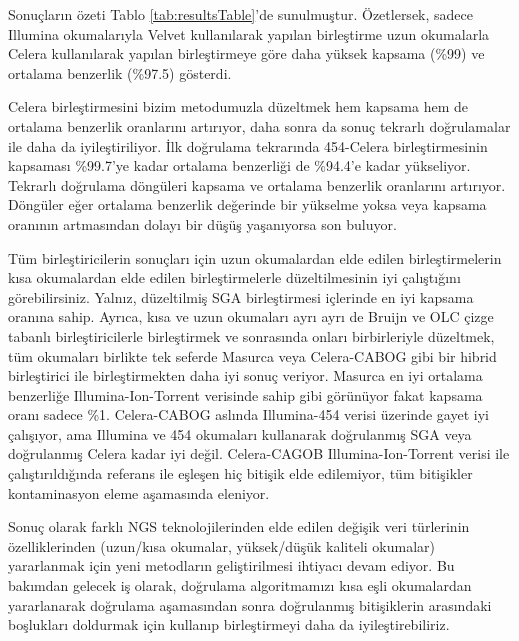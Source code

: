 
Sonuçların özeti Tablo \ref{tab:resultsTable}'de sunulmuştur. 
Özetlersek, sadece Illumina okumalarıyla Velvet kullanılarak yapılan birleştirme uzun okumalarla Celera kullanılarak yapılan birleştirmeye göre daha yüksek kapsama (\%99) ve ortalama benzerlik (\%97.5) gösterdi.

Celera birleştirmesini bizim metodumuzla düzeltmek hem kapsama hem de ortalama benzerlik oranlarını artırıyor, daha sonra da sonuç tekrarlı doğrulamalar ile daha da iyileştiriliyor.
İlk doğrulama tekrarında 454-Celera birleştirmesinin kapsaması \%99.7'ye kadar ortalama benzerliği de \%94.4'e kadar yükseliyor. 
Tekrarlı doğrulama döngüleri kapsama ve ortalama benzerlik oranlarını artırıyor. 
Döngüler eğer ortalama benzerlik değerinde bir yükselme yoksa veya kapsama oranının artmasından dolayı bir düşüş yaşanıyorsa son buluyor. 

Tüm birleştiricilerin sonuçları için uzun okumalardan elde edilen birleştirmelerin kısa okumalardan elde edilen birleştirmelerle düzeltilmesinin iyi çalıştığını görebilirsiniz. 
Yalnız, düzeltilmiş SGA birleştirmesi içlerinde en iyi kapsama oranına sahip.
Ayrıca, kısa ve uzun okumaları ayrı ayrı de Bruijn ve OLC çizge tabanlı birleştiricilerle birleştirmek ve sonrasında onları birbirleriyle düzeltmek, tüm okumaları birlikte tek seferde Masurca veya Celera-CABOG gibi bir hibrid birleştirici ile birleştirmekten daha iyi sonuç veriyor. Masurca en iyi ortalama benzerliğe Illumina-Ion-Torrent verisinde sahip gibi görünüyor fakat kapsama oranı sadece \%1. 
Celera-CABOG aslında Illumina-454 verisi üzerinde gayet iyi çalışıyor, ama Illumina ve 454 okumaları kullanarak doğrulanmış SGA veya doğrulanmış Celera kadar iyi değil. 
Celera-CAGOB Illumina-Ion-Torrent verisi ile çalıştırıldığında referans ile eşleşen hiç bitişik elde edilemiyor, tüm bitişikler kontaminasyon eleme aşamasında eleniyor.

Sonuç olarak farklı NGS teknolojilerinden elde edilen değişik veri türlerinin özelliklerinden (uzun/kısa okumalar, yüksek/düşük kaliteli okumalar) yararlanmak için yeni metodların geliştirilmesi ihtiyacı devam ediyor. 
Bu bakımdan gelecek iş olarak, doğrulama algoritmamızı kısa eşli okumalardan yararlanarak doğrulama aşamasından sonra doğrulanmış bitişiklerin arasındaki boşlukları doldurmak için kullanıp birleştirmeyi daha da iyileştirebiliriz.
 

